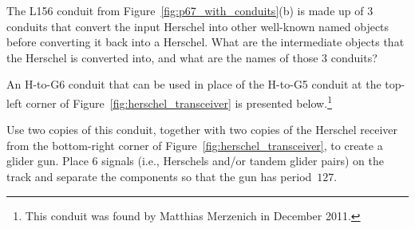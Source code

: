 \begin{multicols}{2}
	
	\mfilbreak
	
	
	\begin{problemstar}\label{exer:l156_break_apart} 
		The L156 conduit from Figure~\ref{fig:p67_with_conduits}(b) is made up of $3$ conduits that convert the input Herschel into other well-known named objects before converting it back into a Herschel. What are the intermediate objects that the Herschel is converted into, and what are the names of those $3$ conduits?
	\end{problemstar}
	
	
	\mfilbreak
	
	
	\begin{problem}\label{exer:h_to_g6} 
		An H-to-G6 conduit that can be used in place of the H-to-G5 conduit at the top-left corner of Figure~\ref{fig:herschel_transceiver} is presented below.\footnote{This conduit was found by Matthias Merzenich in December 2011.}
		
		\begin{center}
		\end{center}
		
		\noindent Use two copies of this conduit, together with two copies of the Herschel receiver from the bottom-right corner of Figure~\ref{fig:herschel_transceiver}, to create a glider gun. Place $6$ signals (i.e., Herschels and/or tandem glider pairs) on the track and separate the components so that the gun has period~$127$.
	\end{problem}



\end{multicols}
